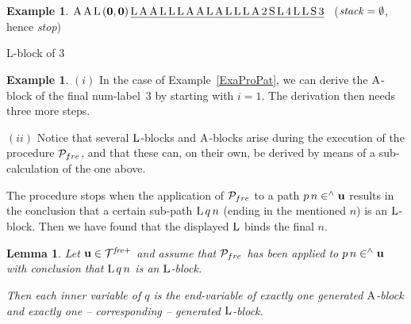 \documentclass{article}
\theoremstyle{plain}
\newtheorem{Lem}[The]{Lemma}
\theoremstyle{definition}
\newtheorem{Exa}[The]{Example}
\begin{document}
{\begin{Exa}
 ${\rm A \, A \, L \, {\bf (0,0)} \, \underline{\rule[-0.1em]{0em}{1em} L \, A \, A \, L \, L \, L \, A \, A \, L \, A \, L \, L \,  L \, A \, 2 \, S \, L \, 4 \, L \, L \, S \, 3}}$ ~(${\it stack\/} = \emptyset$, hence {\it stop})

 \hspace{3.4cm} {\rm L}-block of $3$
\end{Exa}


 \begin{Exa}

$(i)$  In the case of Example~\ref{ExaProPat}, we can derive the ${\rm A}$-block of the final num-label~$3$ by starting with $i = 1$. The derivation then needs three more steps.

$(ii)$  Notice that several ${\rm L}$-blocks and ${\rm A}$-blocks arise during the execution of the procedure ${{\cal P}_{fre}}$, and that these can, on their own, be derived by means of a sub-calculation of the one above.
 \end{Exa}

The procedure stops when the application of ${{\cal P}_{fre}}$ to a path $p \, n \in^\wedge {\bf u}$ results in the conclusion that a certain sub-path ${\rm L} \, q \, n$ (ending in the mentioned $n$) is an ${\rm L}$-block. Then we have found that the displayed ${\rm L}$ binds the final $n$.

\begin{Lem}
Let ${\bf u} \in {\cal T}^{\it fre+}$ and assume that ${{\cal P}_{fre}}$ has been applied to $p \, n \in^\wedge {\bf u}$ with conclusion that ${\rm L} \, q \, n$ is an ${\rm L}$-block.

Then each inner variable of $q$ is the end-variable of exactly one generated ${\rm A}$-block and exactly one -- corresponding -- generated ${\rm L}$-block.
\end{Lem}




}
\end{document}
